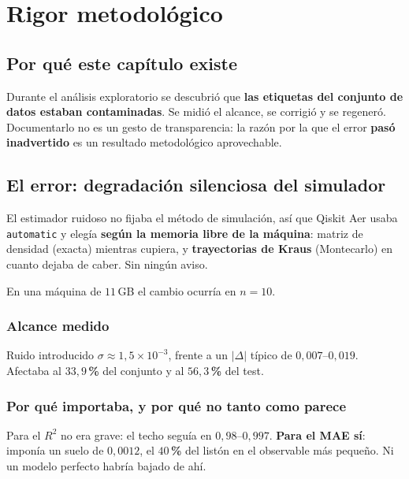 \chapter{Rigor metodológico}
\label{cap:rigor}



\section{Por qué este capítulo existe}
\label{sec:porque_rigor}
Durante el análisis exploratorio se descubrió que \textbf{las etiquetas del conjunto de datos
estaban contaminadas}. Se midió el alcance, se corrigió y se regeneró. Documentarlo no es un
gesto de transparencia: la razón por la que el error \textbf{pasó inadvertido} es un resultado
metodológico aprovechable.

\section{El error: degradación silenciosa del simulador}
\label{sec:bug}
El estimador ruidoso no fijaba el método de simulación, así que Qiskit Aer usaba
\texttt{automatic} y elegía \textbf{según la memoria libre de la máquina}: matriz de densidad
(exacta) mientras cupiera, y \textbf{trayectorias de Kraus} (Montecarlo) en cuanto dejaba de
caber. Sin ningún aviso.

En una máquina de $11$\,GB el cambio ocurría en $n = 10$.

\subsection{Alcance medido}
Ruido introducido $\sigma \approx 1{,}5\times10^{-3}$, frente a un $|\Delta|$ típico de
$0{,}007$--$0{,}019$. Afectaba al \textbf{$33{,}9$\,\%} del conjunto y al \textbf{$56{,}3$\,\%} del test.

\subsection{Por qué importaba, y por qué no tanto como parece}
Para el $R^2$ no era grave: el techo seguía en $0{,}98$--$0{,}997$. \textbf{Para el MAE sí}: imponía
un suelo de $0{,}0012$, el \textbf{$40$\,\%} del listón en el observable más pequeño. Ni un modelo
perfecto habría bajado de ahí.

